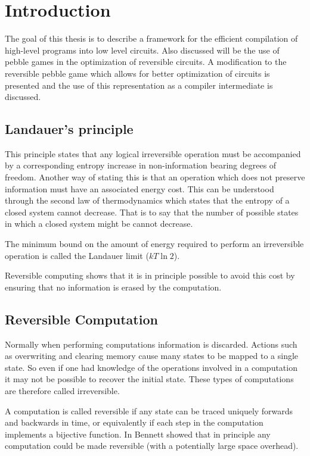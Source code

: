\chapter{Introduction}

The goal of this thesis is to describe a framework for the efficient
compilation of high-level programs into low level circuits. Also discussed will
be the use of pebble games in the optimization of reversible circuits.  A
modification to the reversible pebble game which allows for better optimization
of circuits is presented and the use of this representation as a compiler
intermediate is discussed.

\section{Landauer's principle}

This principle\cite{landauer61} states that any logical irreversible operation
must be accompanied by a corresponding entropy increase in non-information
bearing degrees of freedom. Another way of stating this is that an operation
which does not preserve information must have an associated energy cost. This
can be understood through the second law of thermodynamics which states that
the entropy of a closed system cannot decrease. That is to say that the number
of possible states in which a closed system might be cannot decrease.

The minimum bound on the amount of energy required to perform an irreversible
operation is called the Landauer limit ($kT\ln 2$).

Reversible computing shows that it is in principle possible to avoid this cost
by ensuring that no information is erased by the computation.

\section{Reversible Computation}

Normally when performing computations information is discarded. Actions such as
overwriting and clearing memory cause many states to be mapped to a single
state. So even if one had knowledge of the operations involved in a computation it
may not be possible to recover the initial state. These types of computations
are therefore called irreversible.

A computation is called reversible if any state can be traced uniquely forwards
and backwards in time, or equivalently if each step in the computation
implements a bijective function. In \cite{Bennett:73} Bennett showed that in
principle any computation could be made reversible (with a potentially large
space overhead).

